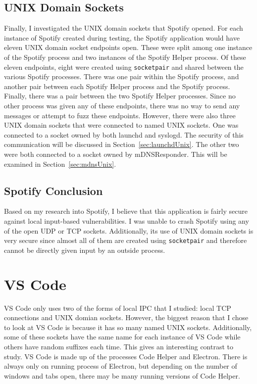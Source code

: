 \subsection{UNIX Domain Sockets}
\label{sec:spotifyUnix}
Finally, I investigated the UNIX domain sockets that Spotify opened.  For each instance of Spotify created during testing, the Spotify application would have eleven UNIX domain socket endpoints open.  These were split among one instance of the Spotify process and two instances of the Spotify Helper process.  Of these eleven endpoints, eight were created using \texttt{socketpair} and shared between the various Spotify processes.  There was one pair within the Spotify process, and another pair between each Spotify Helper process and the Spotify process.  Finally, there was a pair between the two Spotify Helper processes.  Since no other process was given any of these endpoints, there was no way to send any messages or attempt to fuzz these endpoints.  However, there were also three UNIX domain sockets that were connected to named UNIX sockets.  One was connected to a socket owned by both launchd and syslogd.  The security of this communication will be discussed in Section~\ref{sec:launchdUnix}.  The other two were both connected to a socket owned by mDNSResponder.  This will be examined in Section~\ref{sec:mdnsUnix}.

\subsection{Spotify Conclusion}
\label{sec:spotifyConclusion}
Based on my research into Spotify, I believe that this application is fairly secure against local input-based vulnerabilities.  I was unable to crash Spotify using any of the open UDP or TCP sockets.  Additionally, its use of UNIX domain sockets is very secure since almost all of them are created using \texttt{socketpair} and therefore cannot be directly given input by an outside process.

\section{VS Code}
\label{sec:code}
VS Code only uses two of the forms of local IPC that I studied: local TCP connections and UNIX domian sockets.  However, the biggest reason that I chose to look at VS Code is because it has so many named UNIX sockets.  Additionally, some of these sockets have the same name for each instance of VS Code while others have random suffixes each time.  This gives an interesting contrast to study.  VS Code is made up of the processes Code Helper and Electron.  There is always only on running process of Electron, but depending on the number of windows and tabs open, there may be many running versions of Code Helper.

